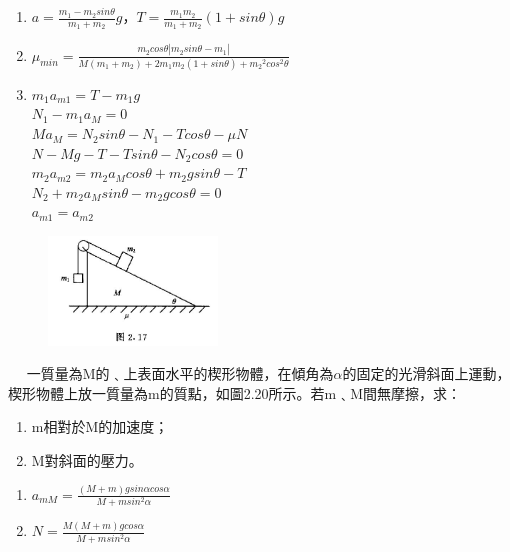 \documentclass[cn,10pt,math=newtx,chinesefont=founder]{../elegantbook}
\begin{document}
\begin{solution}
\begin{enumerate}[label=(\arabic*)]
\item $a = \frac{m_1 - m_2sin\theta}{m_1+m_2}g$，$T = \frac{m_1m_2}{m_1+m_2}(1+sin\theta)g$
\item $\mu_{min} = \frac{m_2cos\theta \left| m_2sin\theta - m_1 \right|}{M(m_1+m_2) + 2m_1m_2(1+sin\theta) + {m_2}^2cos^2\theta}$
\item $m_1a_{m1} = T - m_1g$ \\ $N_1 - m_1a_M = 0$ \\ $Ma_M = N_2sin\theta - N_1 - Tcos\theta - \mu N$ \\ $N - Mg - T - Tsin\theta - N_2cos\theta = 0$ \\ $m_2a_{m2} = m_2a_Mcos\theta + m_2gsin\theta - T$ \\ $N_2 + m_2a_Msin\theta - m_2gcos\theta = 0$ \\ $a_{m1} = a_{m2}$
\end{enumerate}
\end{solution}

\begin{figure}[htbp]
\flushright
\includegraphics[width=0.4\textwidth]{image/2.17.JPG}
\end{figure}

\newpage


\begin{example}　
    一質量為M的﹑上表面水平的楔形物體，在傾角為$\alpha$的固定的光滑斜面上運動，楔形物體上放一質量為m的質點，如圖2.20所示。若m﹑M間無摩擦，求：
    \begin{enumerate}[label=(\arabic*)]
    \item m相對於M的加速度；
    \item M對斜面的壓力。
    \end{enumerate}
    
    \rightline{[2.1.25]}
    
\end{example}

\begin{solution}
\begin{enumerate}[label=(\arabic*)]
\item $a_{mM} = \frac{(M+m)gsin\alpha cos\alpha}{M+msin^2\alpha}$
\item $N = \frac{M(M+m)gcos\alpha}{M+msin^2\alpha}$
\end{enumerate}
\end{solution}
\end{document}
